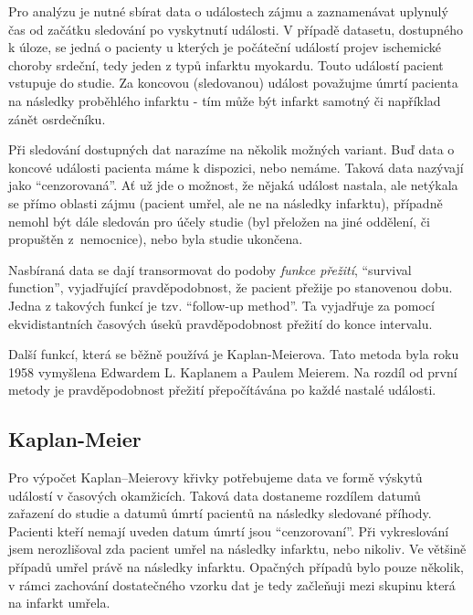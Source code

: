 Pro analýzu je nutné sbírat data o událostech zájmu a zaznamenávat uplynulý čas od začátku sledování po vyskytnutí události.
V případě datasetu, dostupného k úloze, se jedná o pacienty u kterých je počáteční událostí projev ischemické choroby srdeční, tedy jeden z typů infarktu myokardu.
Touto událostí pacient vstupuje do studie.
Za koncovou (sledovanou) událost považujme úmrtí pacienta na následky proběhlého infarktu - tím může být infarkt samotný či například zánět osrdečníku.

Při sledování dostupných dat narazíme na několik možných variant.
Buď data o koncové události pacienta máme k dispozici, nebo nemáme.
Taková data nazývají jako \enquote{cenzorovaná}.
Ať už jde o možnost, že nějaká událost nastala, ale netýkala se přímo oblasti zájmu (pacient umřel, ale ne na následky infarktu), případně nemohl být dále sledován pro účely studie (byl přeložen na jiné oddělení, či propuštěn z~nemocnice), nebo byla studie ukončena.

Nasbíraná data se dají transormovat do podoby \textit{funkce přežití}, \enquote{survival function}, vyjadřující pravděpodobnost, že pacient přežije po stanovenou dobu.
Jedna z takových funkcí je tzv. \enquote{follow-up method}.
Ta vyjadřuje za pomocí ekvidistantních časových úseků pravděpodobnost přežití do konce intervalu.

Další funkcí, která se běžně používá je Kaplan-Meierova.
Tato metoda byla roku 1958 vymyšlena Edwardem L. Kaplanem a Paulem Meierem.
Na rozdíl od první metody je pravděpodobnost přežití přepočítávána po každé nastalé události.

\subsection{Kaplan-Meier}

Pro výpočet Kaplan–Meierovy křivky potřebujeme data ve formě výskytů událostí v časových okamžicích.
Taková data dostaneme rozdílem datumů zařazení do studie a datumů úmrtí pacientů na následky sledované příhody.
Pacienti kteří nemají uveden datum úmrtí jsou \enquote{cenzorovaní}.
Při vykreslování jsem nerozlišoval zda pacient umřel na následky infarktu, nebo nikoliv.
Ve většině případů umřel právě na následky infarktu.
Opačných případů bylo pouze několik, v rámci zachování dostatečného vzorku dat je tedy začleňuji mezi skupinu která na infarkt umřela.

